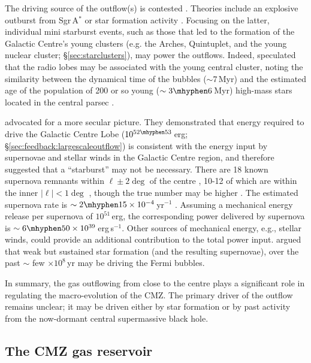 The driving source of the outflow(s) is contested \citep{Su2010}. Theories include an explosive outburst from Sgr\,A$^{*}$ \citep{Zubovas2011, Guo2012,Yang2022} or star formation activity \citep[e.g.,][]{Strickland2000,Law2010,Crocker2012, Lacki2014,DiTeodoro2018}. Focusing on the latter, individual mini starburst events, such as those that led to the formation of the Galactic Centre's young clusters (e.g. the Arches, Quintuplet, and the young nuclear cluster; \S\ref{sec:starclusters}), may power the outflows. Indeed, \citet{Heywood2019} speculated that the radio lobes may be associated with the young central cluster, noting the similarity between the dynamical time of the bubbles ($\sim$7\,Myr) and the estimated age of the population of 200 or so young ($\sim3\mhyphen6$\,Myr) high-mass stars located in the central parsec \citep{Genzel2010}. 

\citet{Law2010} advocated for a more secular picture. They demonstrated that energy required to drive the Galactic Centre Lobe ($10^{52\mhyphen53}$\,erg; \S\ref{sec:feedback:largescaleoutflow}) is consistent with the energy input by supernovae and stellar winds in the Galactic Centre region, and therefore suggested that a ``starburst'' may not be necessary. There are 18 known supernova remnants within $\ell\pm2\deg$ of the centre \citep{Green2019,Dokara2021}, 10-12 of which are within the inner $|\ell|<1\deg$ \citep{Ponti2015}, though the true number may be higher \citep[e.g.][]{Oka2007, Tsujimoto2018}. The estimated supernova rate is $\sim2\mhyphen15\times10^{-4}$\,yr$^{-1}$ \citep{Crocker2011a, Ponti2015}. Assuming a mechanical energy release per supernova of $10^{51}$\,erg, the corresponding power delivered by supernova is $\sim6\mhyphen50\times10^{39}$\,erg\,s$^{-1}$. Other sources of mechanical energy, e.g., stellar winds, could provide an additional contribution to the total power input. \cite{Crocker2015} argued that weak but sustained star formation (and the resulting supernovae), over the past $\sim$ few $\times10^{8}$\,yr may be driving the Fermi bubbles.

In summary, the gas outflowing from close to the centre plays a significant role in regulating the macro-evolution of the CMZ.
The primary driver of the outflow remains unclear; it may be driven either by star formation or by past activity from the now-dormant central supermassive black hole.

\subsection{The CMZ gas reservoir}\label{sec:massreservoir}

